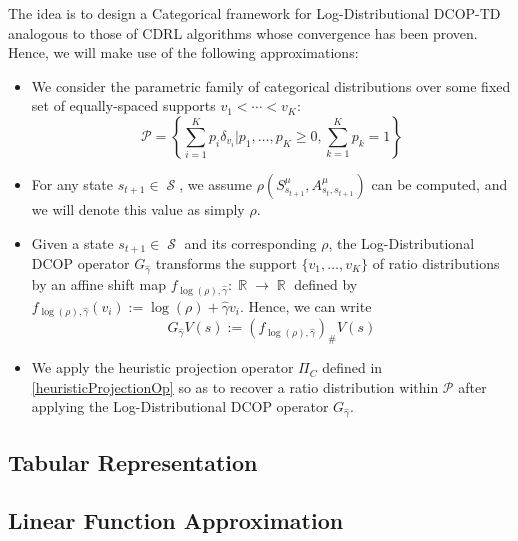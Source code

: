 \documentclass[12pt,a4paper,openright,twoside]{article}
\DeclareMathOperator*{\R}{\mathbb{R}}
\DeclareMathOperator*{\Sspace}{\mathcal{S}}
\numberwithin{equation}{section}
\theoremstyle{definition}
\theoremstyle{remark}
\theoremstyle{plain}
\begin{document}
The idea is to design a Categorical framework for Log-Distributional DCOP-TD analogous to those of CDRL algorithms whose convergence has been proven. Hence, we will make use of the following approximations:
\begin{itemize}
	\item We consider the parametric family of categorical distributions over some fixed set of equally-spaced supports $v_1 < \cdots < v_K$:
		\begin{equation*}
			\mathcal{P} = \left\{ \sum_{i=1}^{K} p_i \delta_{v_i} \Big| p_1, \dots , p_K \geq 0, \sum_{k=1}^{K} p_k = 1 \right\}
		\end{equation*}
		
	\item For any state $s_{t+1} \in \Sspace$, we assume $\rho(S^{\mu}_{s_{t+1}},A^{\mu}_{s_{t},s_{t+1}})$ can be computed, and we will denote this value as simply $\rho$.
	
	\item Given a state $s_{t+1} \in \Sspace$ and its corresponding $\rho$, the Log-Distributional DCOP operator $G_{\hat{\gamma}}$ transforms the support $\{v_1,\dots,v_K\}$ of ratio distributions by an affine shift map $f_{\log(\rho),\hat{\gamma}} : \R \rightarrow \R$ defined by $f_{\log(\rho),\hat{\gamma}}(v_i) := \log(\rho) + \hat{\gamma} v_i$. Hence, we can write
		\begin{equation*}
			G_{\hat{\gamma}} V(s) := (f_{\log(\rho),\hat{\gamma}})_{\#} V(s)
		\end{equation*} 
	
	\item We apply the heuristic projection operator $\Pi_C$ defined in \ref{heuristicProjectionOp} so as to recover a ratio distribution within $\mathcal{P}$ after applying the Log-Distributional DCOP operator $G_{\hat{\gamma}}$.
\end{itemize}









\subsection{Tabular Representation}


\subsection{Linear Function Approximation}
\end{document}
